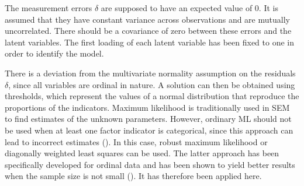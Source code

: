 \documentclass[11pt]{article}
\begin{document}
The measurement errors $\delta$ are supposed to have an expected value of 0.
It is assumed that they have constant variance across observations and are mutually uncorrelated.
There should be a covariance of zero between these errors and the latent variables.
The first loading of each latent variable has been fixed to one in order to identify the model.

There is a deviation from the multivariate normality assumption on the residuals $\delta$, since all variables are ordinal in nature.
A solution can then be obtained using thresholds, which represent the values of a normal distribution that reproduce the proportions of the indicators.
Maximum likelihood is traditionally used in SEM to find estimates of the unknown parameters.
However, ordinary ML should not be used when at least one factor indicator is categorical, since this approach can lead to incorrect estimates (\cite{brown2015}).
In this case, robust maximum likelihood or diagonally weighted least squares can be used.
The latter approach has been specifically developed for ordinal data and has been shown to yield better results when the sample size is not small (\cite{li2016}).
It has therefore been applied here.
\end{document}
